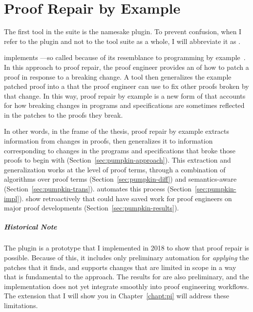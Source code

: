 \chapter{Proof Repair by Example}
\label{ch:example}

The first tool in the    suite is the namesake \sysnamelong plugin.
To prevent confusion, when I refer to the \sysnamelong plugin and not to the tool suite as a whole, I will abbreviate it as \intro{\sysname}.

\sysname implements ---so called because of its resemblance to programming by example~\cite{DBLP:journals/ftpl/GulwaniPS17}.
In this approach to proof repair, the proof engineer provides an  of how to patch a proof in response to a breaking change.
A tool then generalizes the example patched proof into a  that the proof engineer can use to fix other proofs broken by that change.
In this way, proof repair by example is a new form of  that accounts for how 
breaking changes in programs and specifications are sometimes reflected in the patches to the proofs they break.

In other words, in the frame of the thesis, proof repair by example extracts information from changes in proofs,
then generalizes it to information corresponding to changes in the programs and specifications that broke those proofs to begin with (Section~\ref{sec:pumpkin-approach}).
This extraction and generalization works at the level of proof terms, through a combination of  algorithms 
over proof terms (Section~\ref{sec:pumpkin-diff}) and 
semantics-aware  (Section~\ref{sec:pumpkin-trans}).
 automates this process (Section~\ref{sec:pumpkin-impl}).
 show retroactively that \sysname could have saved work for proof engineers
on major proof developments (Section~\ref{sec:pumpkin-results}).

\paragraph{Historical Note}
The \sysname plugin is a prototype that I implemented in 2018 to show that proof repair is possible.
Because of this, it includes only preliminary automation for \textit{applying} the patches that it finds,
and supports changes that are limited in scope in a way that is fundamental to the approach.
The results for \sysname are also preliminary, and the implementation does not yet integrate smoothly into proof engineering workflows.
The \toolnamec extension that I will show you in Chapter~\ref{chapt:pi} will address these limitations.















